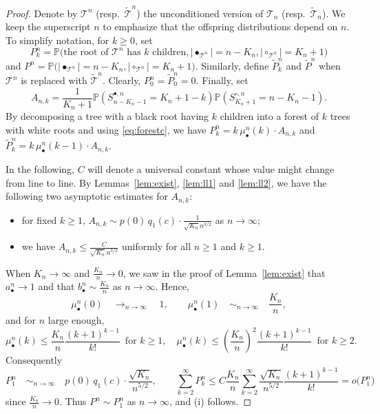 \documentclass[AHL,XML,longabstracts,Unicode]{cedram}
\providecommand{\abs}[1]{\lvert#1\rvert}
\def\abn{a_{\bullet}^{n}}
\def\bbn{b_{\bullet}^{n}}
\def\mubn{\mu_{\bullet}^{n}}
\def\Sbn{S^{\bullet,n}}
\def\Scn{S^{\circ,n}}
\def\tTs{\tilde{\Ts}}
\def\Ts{\mathscr{T}}
\renewcommand\Pr[1]{\mathbb{P}\left(#1\right)}
\newcommand\Prb[1]{\mathbb{P}\big(#1\big)}
\begin{document}
\begin{proof}
Denote by $\Ts^{n}$ (resp.~$\tTs^{n}$) the unconditioned version of $\Ts_{n}$ (resp.~$\tTs_{n}$). We keep the superscript $n$ to emphasize that the offspring distributions depend on $n$. To simplify notation, for $k \geq 0$, set
$$P^{n}_{k}= \Prb{\textrm{the root of }\Ts^{n} \textrm{ has } k \textrm{ children}, \abs{\bullet_{\Ts^{n}}}=n-K_{n}, \abs{\circ_{\Ts^{n}}}=K_{n}+1}$$
and  $P^{n}= \Prb{ \abs{\bullet_{\Ts^{n}}}=n-K_{n}, \abs{\circ_{\Ts^{n}}}=K_{n}+1}$.
Similarly, define $\tilde{P}^{n}_{k}$ and $\tilde{P}^{n}$ when  $\Ts^{n}$ is replaced with $\tTs^{n}$. Clearly, $P^{n}_{0}= \tilde{P}^{n}_{0}=0$.
Finally, set
\[A_{n,k}= \frac{1}{K_{n}+1} \Pr{\Sbn_{n-K_{n}-1}=K_{n}+1-k} \Pr{\Scn_{K_{n}+1}=n-K_{n}-1}.\]
By decomposing a tree with a black root having $k$ children into a forest of $k$ trees with white roots and using \eqref{eq:forestc}, we have
$P^{n}_{k}=  k\, \mubn(k) \cdot  A_{n,k}$ and $\tilde{P}^{n}_{k}= k\, \mubn(k-1) \cdot A_{n,k}$.

In the following, $C$ will denote a universal constant whose value might change from line to line.
By Lemmas~\ref{lem:exist}, \ref{lem:ll1} and \ref{lem:ll2}, we have the following two asymptotic estimates for $A_{n,k}$:
\begin{itemize}
  \item for fixed $k \geq 1$, $ A_{n,k} \sim { p(0) \, q_{1}(c)}\cdot \tfrac{1}{\sqrt{K_{n}} n^{3/2}}$ as $n \rightarrow \infty$;
  \item we have $A_{n,k} \leq  \frac{C}{\sqrt{K_{n}} n^{3/2}}$ uniformly for all $n \geq 1$ and $k \geq 1$.
\end{itemize}
When $K_{n} \rightarrow \infty$ and $\tfrac{K_{n}}{n} \rightarrow 0$, we saw in the proof of Lemma~\ref{lem:exist} that $\abn  \rightarrow 1$ and that $\bbn \sim \frac{K_{n}}{n}$ as $n \rightarrow \infty$. Hence,
\[\mubn(0)  \quad \mathop{\longrightarrow}_{n \rightarrow \infty} \quad 1, \qquad  \mubn(1)  \quad \mathop{\sim}_{n \rightarrow \infty} \quad  \frac{K_{n}}{n},\]
and for $n$ large enough,
\[\mubn(k) \leq  \frac{K_{n}}{{n}} \frac{(k+1)^{k-1}}{k!} \, \textrm{ for } k \geq 1, \quad \mubn(k) \leq  \left(  \frac{K_{n}}{{n}}  \right)^{2} \frac{(k+1)^{k-1}}{k!} \, \textrm{ for } k \geq 2.\]
Consequently
\[ P^{n}_{1}  \quad \mathop{\sim}_{n \rightarrow \infty} \quad   p(0) \,q_{1}(c) \cdot \frac{\sqrt{K_{n}}}{n^{5/2}}, \qquad \sum_{k=2}^{\infty} P^{n}_{k} \leq  C \frac{K_{n}}{n} \sum_{k=2}^{\infty}  \frac{\sqrt{K_{n}}}{n^{5/2}}  \frac{(k+1)^{k-1}}{k!}= o\big( P^{n}_{1}\big)\]
since $\tfrac{K_{n}}{n} \rightarrow 0$.
Thus $P^{n} \sim P^{n}_{1}$ as $n \rightarrow \infty$, and (i) follows.


\end{proof}
\end{document}
